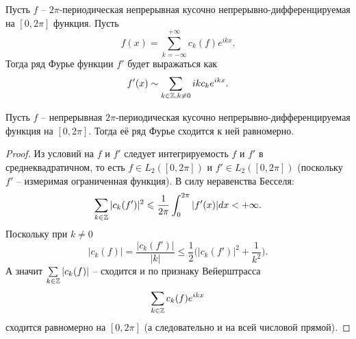 \begin{corollary}
    Пусть $f$ -- $2\pi$-периодическая непрерывная кусочно непрерывно-дифференцируемая на $[0, 2\pi]$ функция.
    Пусть
    \[
        f(x) = \sum_{k = - \infty}^{+\infty} c_k(f) e^{ikx}.
    \]
    Тогда ряд Фурье функции $f'$ будет выражаться как
    \[
        f'(x) \sim \sum\limits_{k \in \mathbb{Z}, k \neq 0} ik c_k e^{ikx}.
    \]
\end{corollary}
\begin{theorem}
    Пусть $f$ -- непрерывная $2\pi$-периодическая кусочно непрерывно-дифференцируемая функция на $[0, 2\pi]$.
    Тогда её ряд Фурье сходится к ней равномерно.
\end{theorem}
\begin{proof}
    Из условий на $f$ и $f'$ следует интегрируемость $f$ и $f'$ в среднеквадратичном, то есть $f \in L_2([0, 2\pi])$ и $f' \in L_2([0, 2\pi])$ (поскольку $f'$ -- измеримая ограниченная функция).
    В силу неравенства Бесселя:
    \[
        \sum\limits_{k \in \mathbb{Z}} |c_k(f')|^2 \leqslant \frac{1}{2\pi} \int_0^{2\pi} |f'(x)|dx < +\infty.
    \]
    Поскольку при $k \neq 0$
    \[
        |c_k(f)| = \dfrac{|c_k(f')|}{|k|} \leq \frac{1}{2}\biggr(|c_k(f')|^2 + \frac{1}{k^2}\biggr).
    \]
    А значит $\sum\limits_{k \in \mathbb{Z}} |c_k(f)|$ -- сходится и по признаку Вейерштрасса
    \[
        \sum\limits_{k \in \mathbb{Z}} c_k(f)e^{ikx}
    \]
    сходится равномерно на $[0, 2\pi]$ (а следовательно и на всей числовой прямой).
\end{proof}

